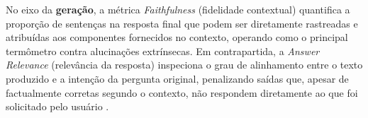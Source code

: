 No eixo da \textbf{geração}, a métrica \textit{Faithfulness} (fidelidade contextual) quantifica a proporção de sentenças na resposta final que podem ser diretamente rastreadas e atribuídas aos componentes fornecidos no contexto, operando como o principal termômetro contra alucinações extrínsecas. Em contrapartida, a \textit{Answer Relevance} (relevância da resposta) inspeciona o grau de alinhamento entre o texto produzido e a intenção da pergunta original, penalizando saídas que, apesar de factualmente corretas segundo o contexto, não respondem diretamente ao que foi solicitado pelo usuário .